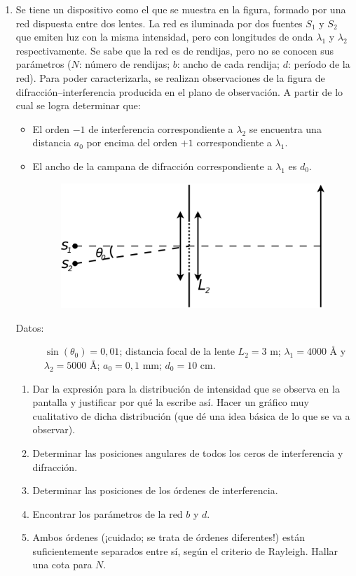 \documentclass[11pt,spanish,a4paper]{article}
\begin{document}
\begin{enumerate}
\item Se tiene un dispositivo como el que se muestra en la figura, formado
por una red dispuesta entre dos lentes. La red es iluminada por dos
fuentes $S_{1}$ y $S_{2}$ que emiten luz con la misma intensidad,
pero con longitudes de onda $\lambda_{1}$ y $\lambda_{2}$ respectivamente.
Se sabe que la red es de rendijas, pero no se conocen sus parámetros
($N$: número de rendijas; $b$: ancho de cada rendija; $d$: período
de la red). Para poder caracterizarla, se realizan observaciones de
la figura de difracción--interferencia producida en el plano de observación.
A partir de lo cual se logra determinar que:
\begin{itemize}
\item El orden $-1$ de interferencia correspondiente a $\lambda_{2}$ se
encuentra una distancia $a_{0}$ por encima del orden $+1$ correspondiente
a $\lambda_{1}$. 
\item El ancho de la campana de difracción correspondiente a $\lambda_{1}$
es $d_{0}$.
\begin{figure}[H]
\centering{}\includegraphics[clip,scale=0.3]{ej5-43}
\end{figure}
\end{itemize}
\begin{description}
\item [{Datos:}] $\sin(\theta_{0})=0,01$; distancia focal de la lente
$L_{2}=3$ m; $\lambda_{1}=4000$ Å y $\lambda_{2}=5000$ Å; $a_{0}=0,1$
mm; $d_{0}=10$ cm.\end{description}
\begin{enumerate}
\item Dar la expresión para la distribución de intensidad que se observa
en la pantalla y justificar por qué la escribe así. Hacer un gráfico
muy cualitativo de dicha distribución (que dé una idea básica de lo
que se va a observar).
\item Determinar las posiciones angulares de todos los ceros de interferencia
y difracción. 
\item Determinar las posiciones de los órdenes de interferencia.
\item Encontrar los parámetros de la red $b$ y $d$. 
\item Ambos órdenes (¡cuidado; se trata de órdenes diferentes!) están suficientemente
separados entre sí, según el criterio de Rayleigh. Hallar una cota
para $N$. 
\end{enumerate}



\end{enumerate}
\end{document}
